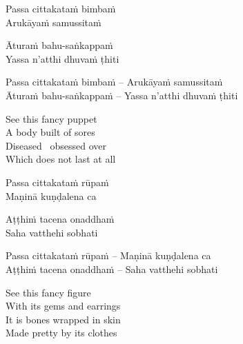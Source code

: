 \fi

\ifninebythirteen

\begin{pali-hang-verses}
  Passa cittakataṁ bimbaṁ\\
  Arukāyaṁ samussitaṁ
\end{pali-hang-verses}
\begin{pali-hang-together}
  Āturaṁ bahu-saṅkappaṁ\\
  Yassa n'atthi dhuvaṁ ṭhiti
\end{pali-hang-together}

\else

\begin{verses}
  Passa cittakataṁ bimbaṁ – Arukāyaṁ samussitaṁ\\
  Āturaṁ bahu-saṅkappaṁ – Yassa n'atthi dhuvaṁ ṭhiti
\end{verses}

\fi

\begin{english-verses}
  See this fancy puppet\\
  A body built of sores\\
  Diseased \breathmark\ obsessed over\\
  Which does not last at all
\end{english-verses}

\ifninebythirteen

\begin{pali-hang-verses}
  Passa cittakataṁ rūpaṁ\\
  Maṇinā kuṇḍalena ca
\end{pali-hang-verses}
\begin{pali-hang-together}
  Aṭṭhiṁ tacena onaddhaṁ\\
  Saha vatthehi sobhati
\end{pali-hang-together}

\else

\begin{verses}
  Passa cittakataṁ rūpaṁ – Maṇinā kuṇḍalena ca\\
  Aṭṭhiṁ tacena onaddhaṁ – Saha vatthehi sobhati
\end{verses}

\fi

\begin{english-verses}
  See this fancy figure\\
  With its gems and earrings\\
  It is bones wrapped in skin\\
  Made pretty by its clothes
\end{english-verses}

